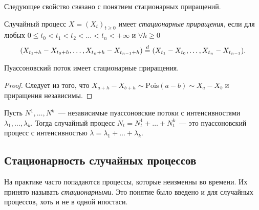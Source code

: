 Следующее свойство связано с понятием стационарных приращений.
\begin{definition}
	Случайный процесс \(X = (X_{t})_{t \geq 0}\) имеет \emph{стационарные 
	приращения}, если для любых \(0 \leq t_{0} < t_{1} < t_{2} < \ldots < 
	t_{n} < +\infty\) и \(\forall h \geq 0\) 
	\[
		(X_{t_{1} + h} - X_{t_{0} + h}, \dots, X_{t_{n} + h} - X_{t_{n - 1} + 
		h}) \overset{d}{=} (X_{t_{1}} - X_{t_{0}}, \dots, X_{t_{n}} - X_{t_{n - 1}}).
	\]
\end{definition}
\begin{property}
	Пуассоновский поток имеет стационарные приращения.
\end{property}
\begin{proof}
	Следует из того, что \(X_{a + h} - X_{b + h} \sim \mathrm{Pois}(a - b) \sim 
	X_{a} - X_{b}\) и приращения независимы.
\end{proof}

\begin{property}
	Пусть \(N^{1}, \ldots, N^{k}\)~--- независимые пуассоновские потоки с 
	интенсивностями \(\lambda_{1}, \ldots, \lambda_{k}\). Тогда случайный 
	процесс \(N_{t} = N_{t}^{1} + \ldots + N_{t}^{k}\)~--- это пуассоновский 
	процесс с интенсивностью \(\lambda = \lambda_{1} + \ldots + \lambda_{k}\).
\end{property}

\subsection{Стационарность случайных процессов}
На практике часто попадаются процессы, которые неизменны во времени. Их принято 
называть \emph{стационарными}. Это понятие было введено и для случайных 
процессов, хоть и не в одной ипостаси.


